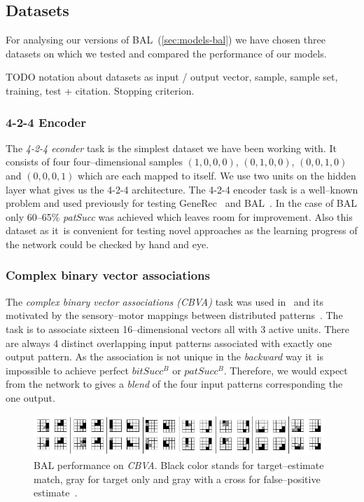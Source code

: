 
\subsection{Datasets}  
\label{sec:sim-data} 

For analysing our versions of BAL~(\ref{sec:models-bal}) we have chosen three datasets on which we tested and compared the performance of our models. 

TODO notation about datasets as input / output vector, sample, sample set, training, test + citation. Stopping criterion. 

\subsubsection{4-2-4 Encoder} 
\label{sec:datasets-auto4}


The \emph{4-2-4 econder} task is the simplest dataset we have been working with. It consists of four four--dimensional samples $(1,0,0,0)$, $(0,1,0,0)$, $(0,0,1,0)$ and $(0,0,0,1)$ which are each mapped to itself. We use two units on the hidden layer what gives us the 4-2-4 architecture. The 4-2-4 encoder task is a well--known problem and used previously for testing GeneRec~\citep{o1996bio} and BAL~\citep{farkas2013bal}. In the case of BAL only 60--65\% \emph{patSucc} was achieved which leaves room for improvement. Also this dataset as it~is convenient for testing novel approaches as the learning progress of the network could be checked by hand and eye. 

\subsubsection{Complex binary vector associations} 
\label{sec:datasets-k3}

The \emph{complex binary vector associations (CBVA)} task was used in~\citet{farkas2013bal} and its motivated by the sensory--motor mappings between distributed patterns~\citep{farkas2013bal}. The task is to associate sixteen 16--dimensional vectors all with 3 active units. There are always 4 distinct overlapping input patterns associated with exactly one output pattern. As the association is not unique in the \emph{backward} way it~is impossible to achieve perfect $bitSucc^B$ or $patSucc^B$. Therefore, we would expect from the network to gives a \emph{blend} of the four input patterns corresponding the one output. 

\begin{figure}[H]
  \centering
  \includegraphics[width=0.98\textwidth]{img/datasets-k3.png} 
  \caption{BAL performance on \emph{CBVA}. Black color stands for target--estimate match, gray for target only and gray with a cross for false--positive estimate~\citep{farkas2013bal}.}
  \label{fig:datasets-k3}
\end{figure}

